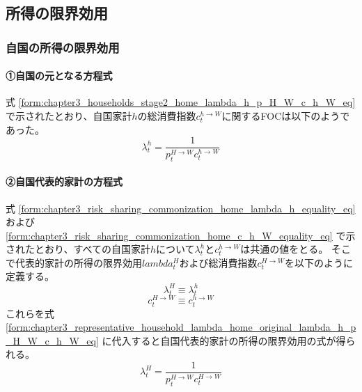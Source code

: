 
\subsection{所得の限界効用}
\label{sec:chapter3_representative_household_lambda}

\subsubsection{自国の所得の限界効用}
\label{sec:chapter3_representative_household_lambda_home}

\paragraph{①自国の元となる方程式}
\label{sec:chapter3_representative_household_lambda_home_original}
式
\eqref{form:chapter3_households_stage2_home_lambda_h_p_H_W_c_h_W_eq}
で示されたとおり、自国家計\(h\)の総消費指数\(c_t^{h\to W}\)に関するFOCは以下のようであった。
\begin{equation}
\label{form:chapter3_representative_household_lambda_home_original_lambda_h_p_H_W_c_h_W_eq}
    \lambda_t^h=\frac{1}{p_t^{H\to W}c_t^{h\to W}}
\end{equation}

\paragraph{②自国代表的家計の方程式}
\label{sec:chapter3_representative_household_lambda_home_representative}
式
\eqref{form:chapter3_risk_sharing_commonization_home_lambda_h_equality_eq}および
\eqref{form:chapter3_risk_sharing_commonization_home_c_h_W_equality_eq}
で示されたとおり、すべての自国家計\(h\)について\(\lambda_t^h\)と\(c_t^{h\to W}\)は共通の値をとる。
そこで代表的家計の所得の限界効用\(lambda_t^H\)および総消費指数\(c_t^{H\to W}\)を以下のように定義する。
\begin{equation}
\label{form:chapter3_representative_household_lambda_home_representative_lambda_H_def}
    \lambda_t^H\equiv\lambda_t^h
\end{equation}
\begin{equation}
\label{form:chapter3_representative_household_lambda_home_representative_c_H_W_def}
    c_t^{H\to W}\equiv c_t^{h\to W}
\end{equation}
これらを式
\eqref{form:chapter3_representative_household_lambda_home_original_lambda_h_p_H_W_c_h_W_eq}
に代入すると自国代表的家計の所得の限界効用の式が得られる。
\begin{equation}
\label{form:chapter3_representative_household_lambda_home_representative_lambda_H_p_H_W_c_H_W_eq}
    \lambda_t^H=\frac{1}{p_t^{H\to W}c_t^{H\to W}}
\end{equation}

